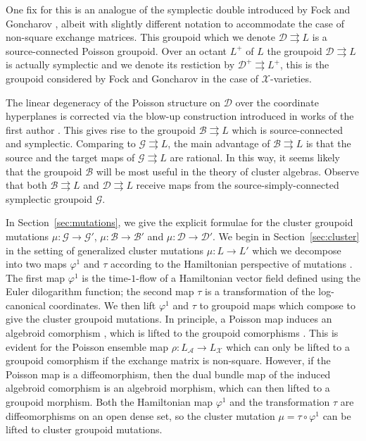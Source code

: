 \documentclass{amsart}
\numberwithin{equation}{section}
\newcommand{\cA}{\mathcal{A}}
\newcommand{\cB}{\mathcal{B}}
\newcommand{\cD}{\mathcal{D}}
\newcommand{\cG}{\mathcal{G}}
\newcommand{\cX}{\mathcal{X}}
\newcommand{\rra}{\rightrightarrows}
\begin{document}
One fix for this is an analogue of the symplectic double introduced by Fock and Goncharov \cite{FG09c}, albeit with slightly different notation to accommodate the case of non-square exchange matrices.
This groupoid which we denote $\cD \rra L$ is a source-connected Poisson groupoid.
Over an octant $L^+$ of $L$ the groupoid $\cD \rra L$ is actually symplectic and we denote its restiction by $\cD^+ \rra L^+$, this is the groupoid considered by Fock and Goncharov in the case of $\cX$-varieties.

The linear degeneracy of the Poisson structure on $\cD$ over the coordinate hyperplanes is corrected via the blow-up construction introduced in works of the first author \cite{MR3312911,MR3214314}.
This gives rise to the groupoid $\cB \rra L$ which is source-connected and symplectic.
Comparing to $\cG \rra L$, the main advantage of $\cB \rra L$ is that the source and the target maps of $\cG \rra L$ are rational.
In this way, it seems likely that the groupoid $\cB$ will be most useful in the theory of cluster algebras.
Observe that both $\cB \rra L$ and $\cD \rra L$ receive maps from the source-simply-connected symplectic groupoid $\cG$.

In Section~\ref{sec:mutations}, we give the explicit formulae for the cluster groupoid mutations $\mu: \cG \to \cG'$, $\mu: \cB \to \cB'$ and $\mu: \cD \to \cD'$.
We begin in Section~\ref{sec:cluster} in the setting of generalized cluster mutations $\mu: L \to L'$ which we decompose into two maps $\varphi^1$ and $\tau$ according to the Hamiltonian perspective of mutations \cite{FG09a, MR3691969}.
The first map $\varphi^1$ is the time-$1$-flow of a Hamiltonian vector field defined using the Euler dilogarithm function; the second map $\tau$ is a transformation of the log-canonical coordinates.
We then lift $\varphi^1$ and $\tau$ to groupoid maps which compose to give the cluster groupoid mutations.
In principle, a Poisson map induces an algebroid comorphism \cite{Higgins1990}, which is lifted to the groupoid comorphisms \cite{MR2063018, MR3089758}. This is evident for the Poisson ensemble map $\rho: L_\cA \to L_\cX$ which can only be lifted to a groupoid comorphism if the exchange matrix is non-square. However, if the Poisson map is a diffeomorphism, then the dual bundle map of the induced algebroid comorphism is an algebroid morphism, which can then lifted to a groupoid morphism.
Both the Hamiltonian map $\varphi^1$ and the transformation $\tau$ are diffeomorphisms on an open dense set, so the cluster mutation $\mu = \tau \circ \varphi^1$ can be lifted to cluster groupoid mutations.
\bigskip
\end{document}
